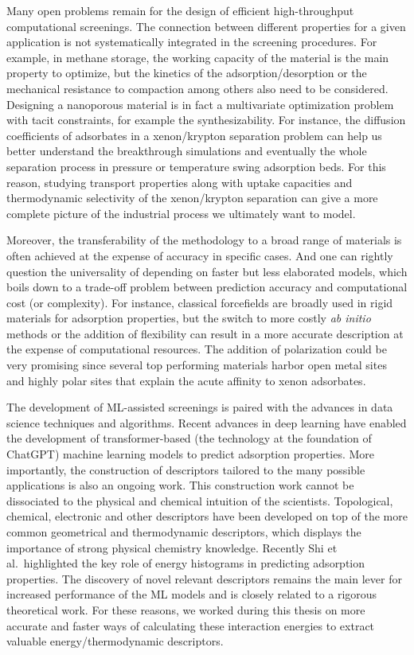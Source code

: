 \documentclass[main.tex]{subfiles}
\begin{document}
Many open problems remain for the design of efficient high-throughput computational screenings. The connection between different properties for a given application is not systematically integrated in the screening procedures. For example, in methane storage, the working capacity of the material is the main property to optimize, but the kinetics of the adsorption/desorption or the mechanical resistance to compaction among others also need to be considered. Designing a nanoporous material is in fact a multivariate optimization problem with tacit constraints, for example the {synthesizability}. For instance, the diffusion coefficients of adsorbates in a xenon/krypton separation problem can help us better understand the breakthrough simulations and eventually the whole separation process in pressure or temperature swing adsorption beds. For this reason, studying transport properties along with uptake capacities and thermodynamic selectivity of the xenon/krypton separation can give a more complete picture of the industrial process we ultimately want to model. 

Moreover, the transferability of the methodology to a broad range of materials is often achieved at the expense of accuracy in specific cases. And one can rightly question the universality of depending on faster but less elaborated models, which boils down to a trade-off problem between prediction accuracy and computational cost (or complexity). For instance, classical forcefields are broadly used in rigid materials for adsorption properties, but the switch to more costly \emph{ab initio} methods or the addition of flexibility can result in a more accurate description at the expense of computational resources. The addition of polarization could be very promising since several top performing materials harbor open metal sites and highly polar sites that explain the acute affinity to xenon adsorbates. 

The development of ML-assisted screenings is paired with the advances in data science techniques and algorithms. Recent advances in deep learning have enabled the development of transformer-based (the technology at the foundation of ChatGPT) machine learning models to predict adsorption properties.\autocite{Kang_2023,Cao_2023} More importantly, the construction of descriptors tailored to the many possible applications is also an ongoing work. This construction work cannot be dissociated to the physical and chemical intuition of the scientists. Topological, chemical, electronic and other descriptors have been developed on top of the more common geometrical and thermodynamic descriptors, which displays the importance of strong physical chemistry knowledge. Recently Shi et al.\ highlighted the key role of energy histograms in predicting adsorption properties.\autocite{Shi_2023}
The discovery of novel relevant descriptors remains the main lever for increased performance of the ML models and is closely related to a rigorous theoretical work.
For these reasons, we worked during this thesis on more accurate and faster ways of calculating these interaction energies to extract valuable energy/thermodynamic descriptors.
\end{document}

